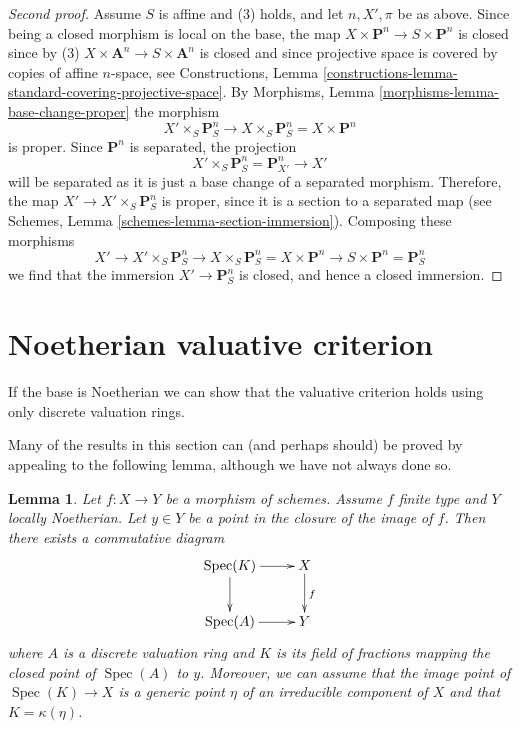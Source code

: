 \documentclass{stacks-project}
\theoremstyle{plain}
\newtheorem{lemma}[subsection]{Lemma}
\theoremstyle{definition}
\theoremstyle{remark}
\numberwithin{equation}{subsection}
\def\Spec{\mathop{\mathrm{Spec}}}
\begin{document}
\begin{proof}[Second proof]
\medskip\noindent
Assume $S$ is affine and (3) holds, and let $n, X', \pi$ be as above.
Since being a closed morphism is local on the base, the map
$X \times \mathbf{P}^n \to S \times \mathbf{P}^n$ is closed since by (3)
$X \times \mathbf{A}^n \to S \times \mathbf{A}^n$ is closed and since
projective space is covered by copies of affine $n$-space, see
Constructions,
Lemma \ref{constructions-lemma-standard-covering-projective-space}.
By Morphisms, Lemma \ref{morphisms-lemma-base-change-proper}
the morphism
$$
X' \times_S \mathbf{P}^n_S
\to
X \times_S \mathbf{P}^n_S =
X \times \mathbf{P}^n
$$
is proper. Since $\mathbf{P}^n$ is separated, the projection
$$
X' \times_S \mathbf{P}^n_S = \mathbf{P}^n_{X'} \to X'
$$
will be separated as it is just a base change of a separated
morphism. Therefore, the map $X' \to X' \times_S \mathbf{P}^n_S$ is proper,
since it is a section to a separated map (see
Schemes, Lemma \ref{schemes-lemma-section-immersion}).
Composing these morphisms
$$
X' \to X' \times_S \mathbf{P}^n_S \to X \times_S \mathbf{P}^n_S
= X \times \mathbf{P}^n \to S \times \mathbf{P}^n = \mathbf{P}^n_S
$$
we find that the immersion $X' \to \mathbf{P}^n_S$ is closed, and
hence a closed immersion.
\end{proof}





\section{Noetherian valuative criterion}
\label{section-Noetherian-valuative-criterion}

\noindent
If the base is Noetherian we can show that the valuative criterion holds
using only discrete valuation rings.

\medskip\noindent
Many of the results in this section can (and perhaps should)
be proved by appealing to the following lemma, although we have not
always done so.

\begin{lemma}
\label{lemma-reach-point-closure-Noetherian}
Let $f : X \to Y$ be a morphism of schemes.
Assume $f$ finite type and $Y$ locally Noetherian.
Let $y \in Y$ be a point in the closure of the image of $f$.
Then there exists a commutative diagram
$$
\xymatrix{
\Spec(K) \ar[r] \ar[d] & X \ar[d]^f \\
\Spec(A) \ar[r] & Y
}
$$
where $A$ is a discrete valuation ring and $K$ is its field of fractions
mapping the closed point of $\Spec(A)$ to $y$. Moreover, we can assume
that the image point of $\Spec(K) \to X$ is a generic point $\eta$
of an irreducible component of $X$ and that $K = \kappa(\eta)$.
\end{lemma}
\end{document}
